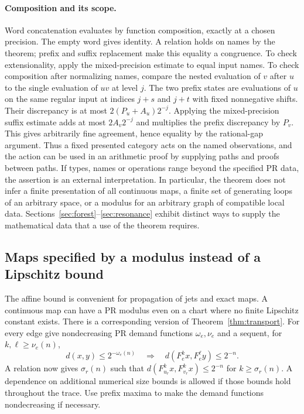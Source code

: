 \paragraph{Composition and its scope.}
Word concatenation evaluates by function composition, exactly at a chosen precision. The empty word gives identity. A relation holds on names by the theorem; prefix and suffix replacement make this equality a congruence. To check extensionality, apply the mixed-precision estimate to equal input names. To check composition after normalizing names, compare the nested evaluation of $v$ after $u$ to the single evaluation of $uv$ at level $j$. The two prefix states are evaluations of $u$ on the same regular input at indices $j+s$ and $j+t$ with fixed nonnegative shifts. Their discrepancy is at most $2(P_u+A_u)2^{-j}$. Applying the mixed-precision suffix estimate adds at most $2A_v2^{-j}$ and multiplies the prefix discrepancy by $P_v$. This gives arbitrarily fine agreement, hence equality by the rational-gap argument. Thus a fixed presented category acts on the named observations, and the action can be used in an arithmetic proof by supplying paths and proofs between paths. If types, names or operations range beyond the specified PR data, the assertion is an external interpretation. In particular, the theorem does not infer a finite presentation of all continuous maps, a finite set of generating loops of an arbitrary space, or a modulus for an arbitrary graph of compatible local data. Sections~\ref{sec:forest}--\ref{sec:resonance} exhibit distinct ways to supply the mathematical data that a use of the theorem requires.

\subsection{Maps specified by a modulus instead of a Lipschitz bound}

The affine bound is convenient for propagation of jets and exact maps. A continuous map can have a PR modulus even on a chart where no finite Lipschitz constant exists. There is a corresponding version of Theorem~\ref{thm:transport}. For every edge give nondecreasing PR demand functions $\omega_e,\nu_e$ and a sequent, for $k,\ell\ge\nu_e(n)$,
\[
 d(x,y)\le 2^{-\omega_e(n)}
 \quad\Longrightarrow\quad d(F_e^k x,F_e^\ell y)\le 2^{-n}.
\]
A relation now gives $\sigma_r(n)$ such that $d(F_{u_r}^k x,F_{v_r}^k x)\le 2^{-n}$ for $k\ge\sigma_r(n)$. A dependence on additional numerical size bounds is allowed if those bounds hold throughout the trace. Use prefix maxima to make the demand functions nondecreasing if necessary.

